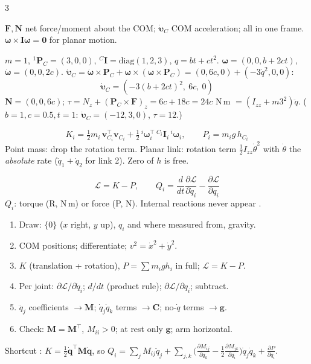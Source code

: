 \begin{multicols}{3}
\begin{fbx}
$\mathbf F,\mathbf N$ net force/moment about the COM; $\dot{\boldsymbol\upsilon}_C$ COM acceleration; all in one frame. $\boldsymbol\omega\times\mathbf I\boldsymbol\omega=\mathbf 0$ for planar motion.
\end{fbx}
\begin{worked}
$m=1$, ${}^1\mathbf P_C=(3,0,0)$, ${}^C\mathbf I=\mathrm{diag}(1,2,3)$, $q=bt+ct^2$. $\boldsymbol\omega=(0,0,b{+}2ct)$, $\dot{\boldsymbol\omega}=(0,0,2c)$. $\dot{\boldsymbol\upsilon}_C=\dot{\boldsymbol\omega}\times\mathbf P_C+\boldsymbol\omega\times(\boldsymbol\omega\times\mathbf P_C)=(0,6c,0)+(-3\dot q^2,0,0)$:
\[\boxed{\dot{\boldsymbol\upsilon}_C=(-3(b+2ct)^2,\ 6c,\ 0)}\]
$\mathbf N=(0,0,6c)$; $\tau=N_z+(\mathbf P_C\times\mathbf F)_z=6c+18c=\boxed{24c}$ N\,m $=(I_{zz}+m3^2)\ddot q$. ($b{=}1,c{=}0.5,t{=}1$: $\dot{\boldsymbol\upsilon}_C=(-12,3,0)$, $\tau=12$.) \chk
\end{worked}

\begin{fbx}
\[K_i=\tfrac12m_i\,\mathbf v_{C_i}^\top\mathbf v_{C_i}+\tfrac12\,{}^i\boldsymbol\omega_i^\top\,{}^{C_i}\mathbf I_i\,{}^i\boldsymbol\omega_i,\qquad P_i=m_ig\,h_{C_i}\]
Point mass: drop the rotation term. Planar link: rotation term $\tfrac12I_{zz}\dot\theta^2$ with $\dot\theta$ the \emph{absolute} rate ($\dot q_1{+}\dot q_2$ for link 2). Zero of $h$ is free.
\end{fbx}
\begin{fbx}
\[\mathcal L=K-P,\qquad Q_i=\frac d{dt}\frac{\partial\mathcal L}{\partial\dot q_i}-\frac{\partial\mathcal L}{\partial q_i}\]
$Q_i$: torque (R, N\,m) or force (P, N). Internal reactions never appear .
\end{fbx}
\begin{recipe}[Lagrange (W13 Q4)]\label{w7:lagrecipe}
\begin{enumerate}
\item Draw: $\{0\}$ ($x$ right, $y$ up), $q_i$ and where measured from, gravity.
\item COM positions; differentiate; $v^2=\dot x^2+\dot y^2$.
\item $K$ (translation + rotation), $P=\sum m_igh_i$ in full; $\mathcal L=K-P$.
\item Per joint: $\partial\mathcal L/\partial\dot q_i$; $d/dt$ (product rule); $\partial\mathcal L/\partial q_i$; subtract.
\item $\ddot q_j$ coefficients $\to\mathbf M$; $\dot q_j\dot q_k$ terms $\to\mathbf C$; no-$\dot q$ terms $\to\mathbf g$.
\item Check: $\mathbf M=\mathbf M^\top$, $M_{ii}>0$; at rest only $\mathbf g$; arm horizontal.
\end{enumerate}
\end{recipe}
Shortcut \added: $K=\tfrac12\dot{\mathbf q}^\top\mathbf M\dot{\mathbf q}$, so $Q_i=\sum_jM_{ij}\ddot q_j+\sum_{j,k}\big(\tfrac{\partial M_{ij}}{\partial q_k}-\tfrac12\tfrac{\partial M_{jk}}{\partial q_i}\big)\dot q_j\dot q_k+\tfrac{\partial P}{\partial q_i}$.


\end{multicols}
